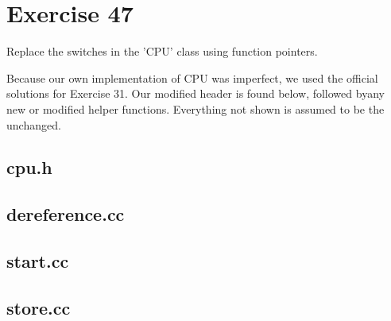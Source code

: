 \section*{Exercise 47}
\begin{question}
Replace the switches in the 'CPU' class using function pointers.
\end{question}

\begin{solution}
    Because our own implementation of CPU was imperfect, we used the official solutions for Exercise 31.
    Our modified header is found below, followed byany new or modified helper functions. Everything not shown is assumed to be the unchanged.
    \subsection*{cpu.h}
    \subsection*{dereference.cc}
    \subsection*{start.cc}
    \subsection*{store.cc}
\end{solution}
